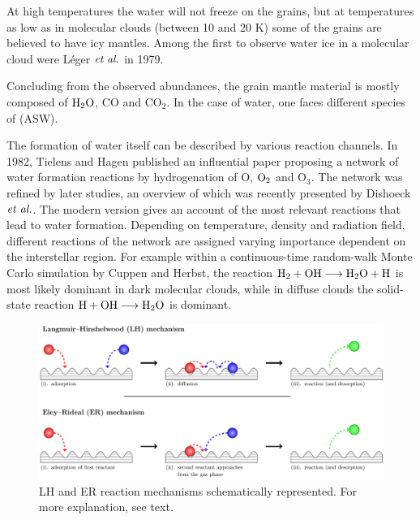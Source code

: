
At high temperatures the water will not freeze on the grains, but at
temperatures as low as in molecular clouds (between 10 and 20
K)\cite{Ferriere2001} some of the grains are believed to have icy mantles.
Among the first to observe water ice in a molecular cloud were Léger $\emph{et al.}$ in
1979.\cite{Leger1979}

Concluding from the observed abundances, the grain mantle material is mostly
composed of $\text H _2 \text O$, CO and CO$_2$. In the case of water, one faces different
species of  (ASW).\cite{DishoeckHerbstNeufeld2013,JenniskensBlakeWilsonEtAl1995}

The formation of water itself can be described by various reaction channels. In
1982, Tielens and Hagen published an influential paper
proposing a network of water formation reactions by hydrogenation of O, $\text O_2$
and O$_3$.\cite{TielensHagen1982} The network was refined by later studies, an
overview of which was recently presented by Dishoeck $\emph{et al.}$.
\cite{DishoeckHerbstNeufeld2013}
The modern version gives an account of the most relevant reactions that lead to
water formation. Depending on temperature, density and radiation field,
different reactions of the network are assigned varying importance dependent on the
interstellar region. For example within a continuous-time random-walk Monte
Carlo simulation by Cuppen and Herbst, the reaction
\mbox{$\text H_2+\text O \text H\longrightarrow\text H _2 \text O+\text H$} is most likely dominant in dark molecular
clouds, while in diffuse clouds the solid-state reaction \mbox{$\text
H+\text O \text H\longrightarrow\text H _2 \text O$} is dominant. \cite{CuppenHerbst2007}

\begin{figure}[b!]
\includegraphics[width=\textwidth]{TikzPics/TikzCreation/LHAndER/LHAndER.pdf}
\caption{LH and ER reaction mechanisms schematically represented. For
more explanation, see text.}
\label{Int:LHandER}
\end{figure}

